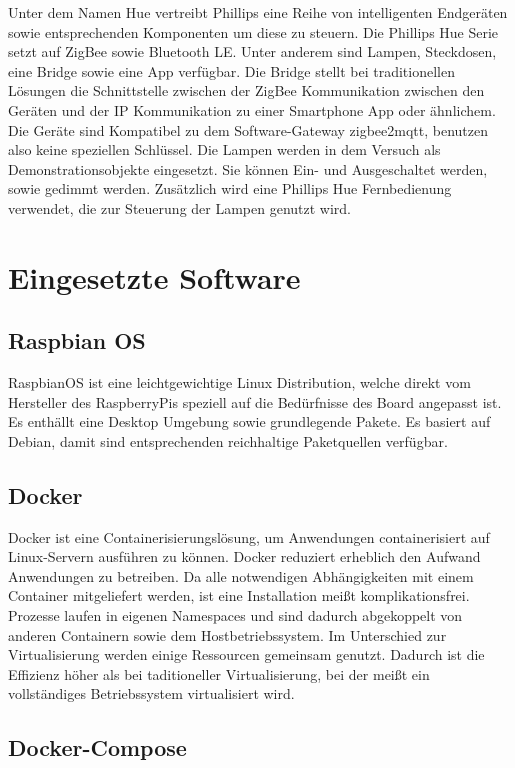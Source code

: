 Unter dem Namen \grqq Hue \grqq{} vertreibt Phillips eine Reihe von intelligenten Endgeräten sowie entsprechenden Komponenten um diese zu steuern.
Die Phillips Hue Serie setzt auf ZigBee sowie Bluetooth LE. Unter anderem sind Lampen, Steckdosen, eine Bridge sowie eine App verfügbar.
Die Bridge stellt bei traditionellen Lösungen die Schnittstelle zwischen der ZigBee Kommunikation zwischen den Geräten und der IP Kommunikation zu einer Smartphone
App oder ähnlichem. Die Geräte sind Kompatibel zu dem Software-Gateway zigbee2mqtt, benutzen also keine speziellen Schlüssel.
Die Lampen werden in dem Versuch als Demonstrationsobjekte eingesetzt. Sie können Ein- und Ausgeschaltet werden, sowie gedimmt werden. Zusätzlich wird eine
Phillips Hue Fernbedienung verwendet, die zur Steuerung der Lampen genutzt wird.

\section{Eingesetzte Software}

\subsection{Raspbian OS}

RaspbianOS ist eine leichtgewichtige Linux Distribution, welche direkt vom Hersteller des RaspberryPis speziell auf die Bedürfnisse des Board angepasst ist. Es enthällt eine
Desktop Umgebung sowie grundlegende Pakete. Es basiert auf Debian, damit sind entsprechenden reichhaltige Paketquellen verfügbar. 

\subsection{Docker}

Docker ist eine Containerisierungslösung, um Anwendungen containerisiert auf Linux-Servern ausführen zu können. Docker reduziert erheblich den Aufwand 
Anwendungen zu betreiben. Da alle notwendigen Abhängigkeiten mit einem Container mitgeliefert werden, ist eine Installation meißt komplikationsfrei.
Prozesse laufen in eigenen Namespaces und sind dadurch abgekoppelt von anderen Containern sowie dem Hostbetriebssystem. Im Unterschied zur Virtualisierung werden
einige Ressourcen gemeinsam genutzt. Dadurch ist die Effizienz höher als bei taditioneller Virtualisierung, bei der meißt ein vollständiges Betriebssystem virtualisiert wird.

\subsection{Docker-Compose}

